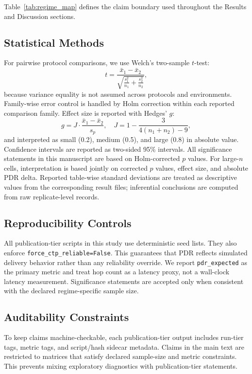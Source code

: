 ﻿\documentclass[sensors,article,submit,moreauthors,pdftex]{Definitions/mdpi}
\begin{document}
Table~\ref{tab:regime_map} defines the claim boundary used throughout the Results and Discussion sections.

\subsection{Statistical Methods}
For pairwise protocol comparisons, we use Welch's two-sample $t$-test:
\begin{equation}
t=\frac{\bar{x}_1-\bar{x}_2}{\sqrt{\frac{s_1^2}{n_1}+\frac{s_2^2}{n_2}}},
\end{equation}
because variance equality is not assumed across protocols and environments. Family-wise error control is handled by Holm correction within each reported comparison family. Effect size is reported with Hedges' $g$:
\begin{equation}
g = J\cdot\frac{\bar{x}_1-\bar{x}_2}{s_p},\quad
J=1-\frac{3}{4(n_1+n_2)-9},
\end{equation}
and interpreted as small (0.2), medium (0.5), and large (0.8) in absolute value. Confidence intervals are reported as two-sided 95\% intervals. All significance statements in this manuscript are based on Holm-corrected $p$ values. For large-$n$ cells, interpretation is based jointly on corrected $p$ values, effect size, and absolute PDR delta. Reported table-wise standard deviations are treated as descriptive values from the corresponding result files; inferential conclusions are computed from raw replicate-level records.

\subsection{Reproducibility Controls}
All publication-tier scripts in this study use deterministic seed lists. They also enforce \texttt{force\_ctp\_reliable=False}. This guarantees that PDR reflects simulated delivery behavior rather than any reliability override. We report \texttt{pdr\_expected} as the primary metric and treat hop count as a latency proxy, not a wall-clock latency measurement. Significance statements are accepted only when consistent with the declared regime-specific sample size.

\subsection{Auditability Constraints}
To keep claims machine-checkable, each publication-tier output includes run-tier tags, metric tags, and script/hash sidecar metadata. Claims in the main text are restricted to matrices that satisfy declared sample-size and metric constraints. This prevents mixing exploratory diagnostics with publication-tier statements.
\end{document}

